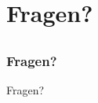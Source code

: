 \documentclass{beamer}
\begin{document}
\section{Fragen?}
\subsection*{}

\begin{frame}
	
	\frametitle{Fragen?}
	\begin{center}
		\large Fragen?
	\end{center}
\end{frame}
\end{document}
